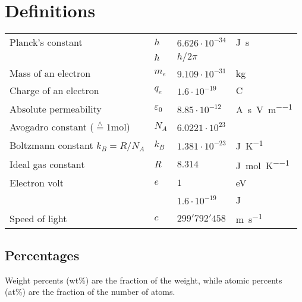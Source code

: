 \section{Definitions}

\begin{tabularx}{\linewidth}{Xlll}

	Planck's constant & $h$ & $6.626 \cdot 10^{-34}$ & \si{\J\second} \\
		& $\hbar$ & $h / 2\pi$ & \\
	Mass of an electron & $m_e$ &  $9.109 \cdot 10^{-31}$ & \si{\kilogram} \\
	Charge of an electron & $q_e$ & $1.6 \cdot 10^{-19}$ & \si{\coulomb} \\
	Absolute permeability & $\varepsilon_0$ & $8.85 \cdot 10^{-12}$ & \si{\ampere\second\per\volt\per\meter} \\
	Avogadro constant  ($\stackrel{\wedge}{=}1$\si{\mol})& $N_A$ & $6.0221 \cdot 10^{23}$ & \\
	Boltzmann constant $k_B = R / N_A$& $k_B$ & $1.381 \cdot10^{-23}$ & \si{\J\per\K} \\
	Ideal gas constant & $R$ & $8.314$ & \si{\J\per\mol\per\K} \\
	Electron volt & $e$ & $1$ & \si{\eV} \\
		& & $1.6 \cdot 10^{-19}$ & \si{\J} \\ 
	Speed of light & $c$ & $299'792'458$ & \si{\meter\per\second} \\
\end{tabularx}

\subsection{Percentages}
Weight percents (wt\%) are the fraction of the weight, while atomic percents (at\%) are the fraction of the number of atoms.